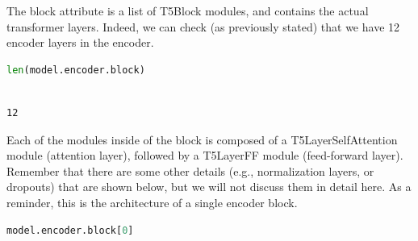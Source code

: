 \documentclass[../labs.tex]{subfiles}
\begin{document}


\noindent The block attribute is a list of T5Block modules, and contains the actual transformer layers. Indeed, we can check (as previously stated) that we have 12 encoder layers in the encoder.

\begin{lstlisting}[language=Python,basicstyle=\ttfamily\scriptsize,breaklines=true,breakatwhitespace=false,columns=fullflexible,keepspaces=true,numbers=none]
len(model.encoder.block)
\end{lstlisting}

\hypertarget{res:lab02-text-01-t5-ipynb-59-33ac656b7dc3}{}

\begin{lstlisting}[basicstyle=\ttfamily\scriptsize,breaklines=true,breakatwhitespace=false,columns=fullflexible,keepspaces=true]

12

\end{lstlisting}



\noindent Each of the modules inside of the block is composed of a T5LayerSelfAttention module (attention layer), followed by a T5LayerFF module (feed-forward layer). Remember that there are some other details (e.g., normalization layers, or dropouts) that are shown below, but we will not discuss them in detail here. As a reminder, this is the architecture of a single encoder block.

\begin{lstlisting}[language=Python,basicstyle=\ttfamily\scriptsize,breaklines=true,breakatwhitespace=false,columns=fullflexible,keepspaces=true,numbers=none]
model.encoder.block[0]
\end{lstlisting}

\hypertarget{res:lab02-text-01-t5-ipynb-61-d53d8daef20e}{}
\end{document}
